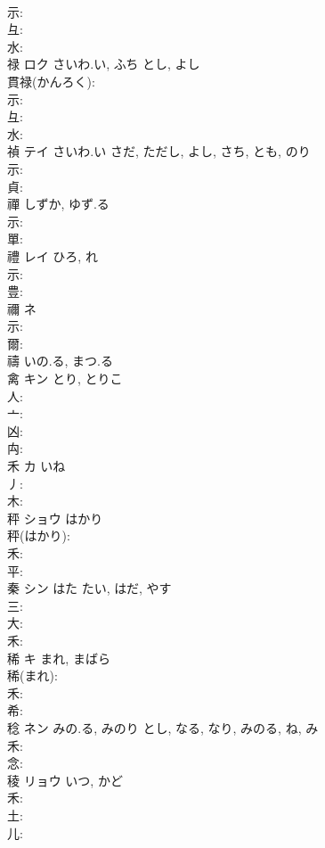 \documentclass[8pt]{extreport}
\begin{document}
\begin{CJK}{UTF8}{min}
\\	示: 
\\	彑: 
\\	水: 
\\	禄	ロク	さいわ.い, ふち	とし, よし	
\\	貫禄(かんろく): 
\\	示: 
\\	彑: 
\\	水: 
\\	禎	テイ	さいわ.い	さだ, ただし, よし, さち, とも, のり	
\\	示: 
\\	貞: 
\\	禪		しずか, ゆず.る				
\\	示: 
\\	單: 
\\	禮	レイ		ひろ, れ			
\\	示: 
\\	豊: 
\\	禰	ネ			
\\	示: 
\\	爾: 
\\	禱		いの.る, まつ.る				
\\	禽	キン	とり, とりこ		
\\	人: 
\\	亠: 
\\	凶: 
\\	禸: 
\\	禾	カ	いね		
\\	丿: 
\\	木: 
\\	秤	ショウ	はかり		
\\	秤(はかり): 
\\	禾: 
\\	平: 
\\	秦	シン	はた	たい, はだ, やす	
\\	三: 
\\	大: 
\\	禾: 
\\	稀	キ	まれ, まばら		
\\	稀(まれ): 
\\	禾: 
\\	希: 
\\	稔	ネン	みの.る, みのり	とし, なる, なり, みのる, ね, み	
\\	禾: 
\\	念: 
\\	稜	リョウ	いつ, かど		
\\	禾: 
\\	土: 
\\	儿: 

\end{CJK}
\end{document}
